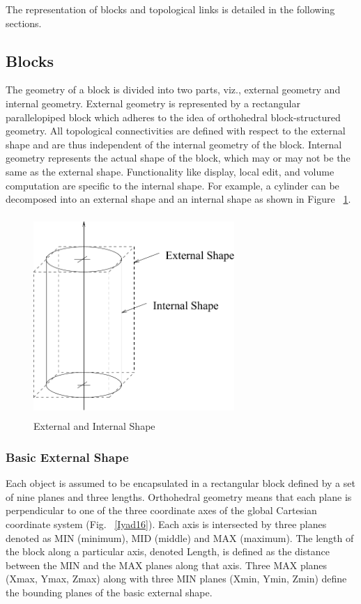 	
	The representation of blocks and topological links is detailed in the
	following sections.

	\subsection{Blocks} 

	The geometry of a block is divided into two parts, viz., external geometry
	and internal geometry. External geometry is represented by a rectangular
	parallelopiped block which adheres to the idea of orthohedral 
	block-structured geometry. All topological connectivities are defined
	with respect to the external shape and are thus independent of the 
	internal geometry of the block. Internal geometry represents the actual
	shape of the block, which may or may not be the same as the external shape.
	Functionality like display, local edit, and volume computation are specific
	to the internal shape. For example, a cylinder can be decomposed into
	an external shape and an internal shape as shown in Figure ~\ref{cylblk}.

        \begin{figure}[htbp]
        	\hspace{2.5cm}
	\includegraphics[width=3.0in,height=3.0in]{CYLBLK.pdf}
            \caption{External and Internal Shape}
            \label{cylblk}
        \end{figure}

	\subsubsection{Basic External Shape }

		Each object is assumed to be encapsulated in a rectangular block defined
	by a set of nine planes and three lengths. Orthohedral geometry means that 
	each plane is perpendicular to one of the three coordinate axes of the 
	global Cartesian coordinate system (Fig. ~\ref{Iyad16}). 
	Each axis is intersected by three planes denoted as MIN (minimum), 
	MID (middle) and MAX (maximum). The length of the block along a 
	particular axis, denoted Length, is defined as the distance between the MIN 	and the MAX planes along that axis. Three MAX planes (Xmax, Ymax, Zmax) 
	along with three MIN planes (Xmin, Ymin, Zmin) define the bounding planes 
	of the basic external shape.



